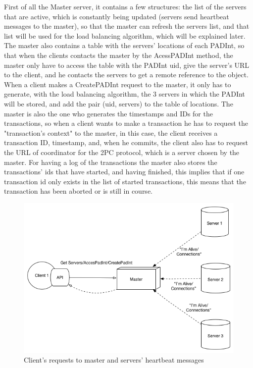 \documentclass[times, 10pt,twocolumn]{article}
\begin{document}
First of all the Master server, it contains a few structures: the list of the servers that are active, which is constantly being updated (servers send heartbeat messages to the master), so that the master can refresh the servers list, and that list will be used for the load balancing algorithm, which will be explained later. The master also contains a table with the servers' locations of each PADInt, so that when the clients contacts the master by the AcessPADInt method, the master only have to access the table with the PADInt uid, give the server's URL to the client, and he contacts the servers to get a remote reference to the object. When a client makes a CreatePADInt request to the master, it only has to generate, with the load balancing algorithm, the 3 servers in which the PADInt will be stored, and add the pair (uid, servers) to the table of locations. The master is also the one who generates the timestamps and IDs for the transactions, so when a client wants to make a transaction he has to request the "transaction's context" to the master, in this case, the client receives a transaction ID, timestamp, and, when he commits, the client also has to request the URL of coordinator for the 2PC protocol, which is a server chosen by the master. For having a log of the transactions the master also stores the transactions' ids that have started, and having finished, this implies that if one transaction id only exists in the list of started transactions, this means that the transaction has been aborted or is still in course.

\begin{figure}[h!]

\centering

\includegraphics[scale=0.4]{Client-Master.png}

\caption{Client's requests to master and servers' heartbeat messages}

\end{figure}
\end{document}
